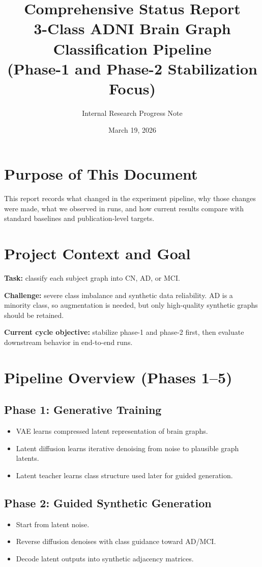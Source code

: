 \documentclass[11pt,a4paper]{article}
\title{Comprehensive Status Report\\
3-Class ADNI Brain Graph Classification Pipeline\\
{\large (Phase-1 and Phase-2 Stabilization Focus)}}
\author{Internal Research Progress Note}
\date{March 19, 2026}
\begin{document}
\maketitle

\section{Purpose of This Document}
This report records what changed in the experiment pipeline, why those changes were made, what we observed in runs, and how current results compare with standard baselines and publication-level targets.

\section{Project Context and Goal}
\textbf{Task:} classify each subject graph into CN, AD, or MCI.

\textbf{Challenge:} severe class imbalance and synthetic data reliability. AD is a minority class, so augmentation is needed, but only high-quality synthetic graphs should be retained.

\textbf{Current cycle objective:} stabilize phase-1 and phase-2 first, then evaluate downstream behavior in end-to-end runs.

\section{Pipeline Overview (Phases 1--5)}
\subsection{Phase 1: Generative Training}
\begin{itemize}[leftmargin=1.2em]
    \item VAE learns compressed latent representation of brain graphs.
    \item Latent diffusion learns iterative denoising from noise to plausible graph latents.
    \item Latent teacher learns class structure used later for guided generation.
\end{itemize}

\subsection{Phase 2: Guided Synthetic Generation}
\begin{itemize}[leftmargin=1.2em]
    \item Start from latent noise.
    \item Reverse diffusion denoises with class guidance toward AD/MCI.
    \item Decode latent outputs into synthetic adjacency matrices.
\end{itemize}
\end{document}
